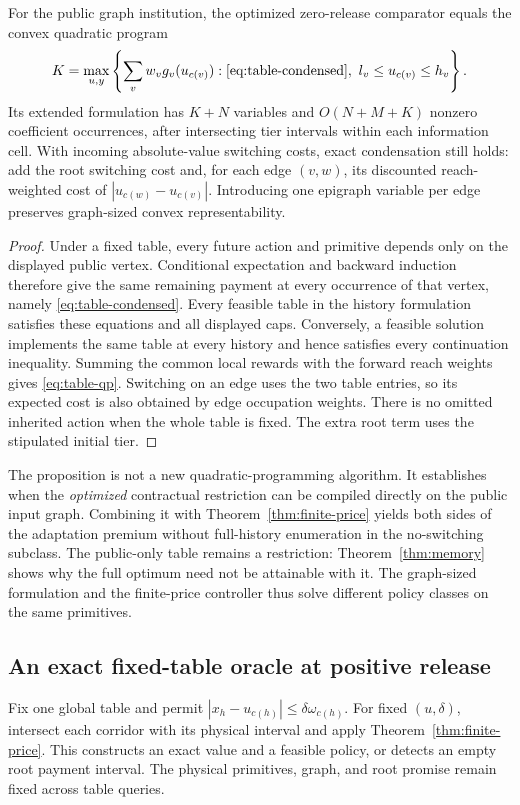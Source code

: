 \begin{proposition}\label{prop:table-condensed}
For the public graph institution, the optimized zero-release comparator equals the convex quadratic program
\begin{equation}\label{eq:table-qp}
 K=\max_{u,y}\left\{\sum_vw_vg_v(u_{c(v)}):
 \eqref{eq:table-condensed},\ l_v\leq u_{c(v)}\leq h_v\right\}.
\end{equation}
Its extended formulation has $K+N$ variables and $O(N+M+K)$ nonzero coefficient occurrences, after intersecting tier intervals within each information cell. With incoming absolute-value switching costs, exact condensation still holds: add the root switching cost and, for each edge $(v,w)$, its discounted reach-weighted cost of $|u_{c(w)}-u_{c(v)}|$. Introducing one epigraph variable per edge preserves graph-sized convex representability.
\end{proposition}
\begin{proof}
Under a fixed table, every future action and primitive depends only on the displayed public vertex. Conditional expectation and backward induction therefore give the same remaining payment at every occurrence of that vertex, namely \eqref{eq:table-condensed}. Every feasible table in the history formulation satisfies these equations and all displayed caps. Conversely, a feasible solution implements the same table at every history and hence satisfies every continuation inequality. Summing the common local rewards with the forward reach weights gives \eqref{eq:table-qp}. Switching on an edge uses the two table entries, so its expected cost is also obtained by edge occupation weights. There is no omitted inherited action when the whole table is fixed. The extra root term uses the stipulated initial tier.
\end{proof}

The proposition is not a new quadratic-programming algorithm. It establishes when the \emph{optimized} contractual restriction can be compiled directly on the public input graph. Combining it with Theorem~\ref{thm:finite-price} yields both sides of the adaptation premium without full-history enumeration in the no-switching subclass. The public-only table remains a restriction: Theorem~\ref{thm:memory} shows why the full optimum need not be attainable with it. The graph-sized formulation and the finite-price controller thus solve different policy classes on the same primitives.

\subsection{An exact fixed-table oracle at positive release}
Fix one global table and permit $|x_h-u_{c(h)}|\leq\delta\omega_{c(h)}$. For fixed $(u,\delta)$, intersect each corridor with its physical interval and apply Theorem~\ref{thm:finite-price}. This constructs an exact value and a feasible policy, or detects an empty root payment interval. The physical primitives, graph, and root promise remain fixed across table queries.

